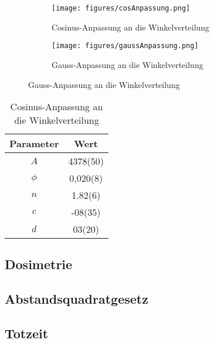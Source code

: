 \documentclass{article}
\begin{document}
\begin{figure}[H]
    \centering
    \begin{subfigure}[b]{0.48\textwidth}
        \texttt{[image: figures/cosAnpassung.png]}
        \caption{Cosinus-Anpassung an die Winkelverteilung}
        \label{fig:WinkelverteilungCosinus}
    \end{subfigure}
    \hfill
    \begin{subfigure}[b]{0.48\textwidth}
        \texttt{[image: figures/gaussAnpassung.png]}
        \caption{Gauss-Anpassung an die Winkelverteilung}
        \label{fig:WinkelverteilungGauss}
    \end{subfigure}
    \label{fig:WinkelverteilungKomplett}
\end{figure}

\begin{table}[H]
    \centering
    \caption{Cosinus-Anpassung an die Winkelverteilung}
    \begin{tabular}{|c|c|}
        \hline
        Parameter & Wert \\ \hline \hline
        $A$ & 4378(50) \\ \hline 
        $\phi$ & 0,020(8) \\ \hline
        $n$ & 1.82(6) \\ \hline
        $c$ & -08(35) \\ \hline
        $d$ & 03(20) \\ \hline
    \end{tabular}
    \label{tab:CosinusAnpassungWinkelverteilung}
\end{table}

\subsection{Dosimetrie}


\subsection{Abstandsquadratgesetz}


\subsection{Totzeit}
\end{document}
